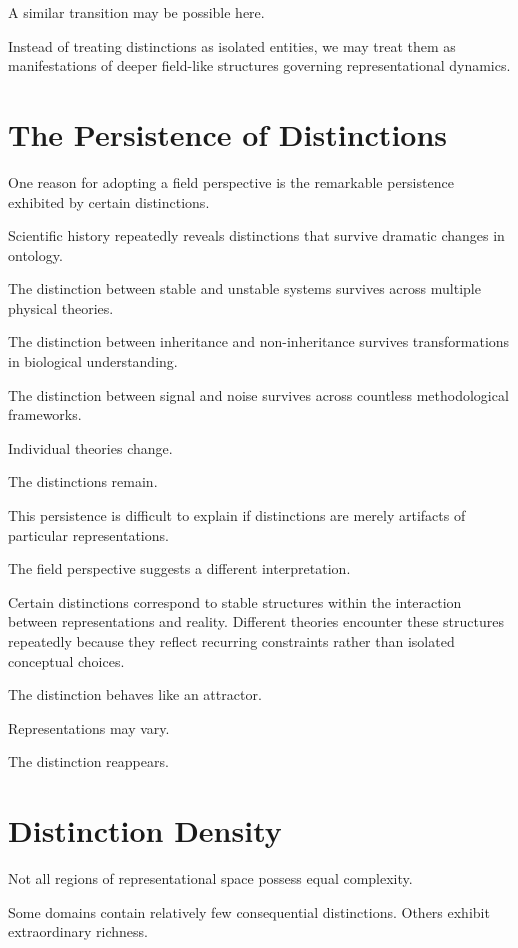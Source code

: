 \documentclass[11pt,oneside,openany]{book}
\begin{document}
A similar transition may be possible here.

Instead of treating distinctions as isolated entities, we may treat them as manifestations of deeper field-like structures governing representational dynamics.

\section{The Persistence of Distinctions}

One reason for adopting a field perspective is the remarkable persistence exhibited by certain distinctions.

Scientific history repeatedly reveals distinctions that survive dramatic changes in ontology.

The distinction between stable and unstable systems survives across multiple physical theories.

The distinction between inheritance and non-inheritance survives transformations in biological understanding.

The distinction between signal and noise survives across countless methodological frameworks.

Individual theories change.

The distinctions remain.

This persistence is difficult to explain if distinctions are merely artifacts of particular representations.

The field perspective suggests a different interpretation.

Certain distinctions correspond to stable structures within the interaction between representations and reality. Different theories encounter these structures repeatedly because they reflect recurring constraints rather than isolated conceptual choices.

The distinction behaves like an attractor.

Representations may vary.

The distinction reappears.

\section{Distinction Density}

Not all regions of representational space possess equal complexity.

Some domains contain relatively few consequential distinctions. Others exhibit extraordinary richness.
\end{document}
